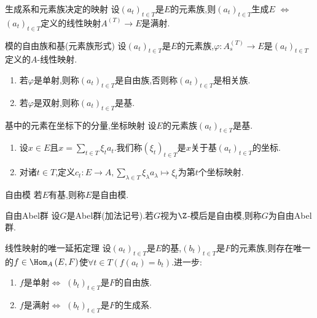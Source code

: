 \begin{corollary}{生成系和元素族决定的映射}{}
	设$\left(a_{t}\right)_{t\in T}$是$E$的元素族,则$\left(a_{t}\right)_{t\in T}$生成$E$ $\iff$ $\left(a_{t}\right)_{t\in T}$定义的线性映射$A^{\left(T\right)}\to E$是满射.
\end{corollary}

\begin{definition}{模的自由族和基(元素族形式)}{}
	设$\left(a_{t}\right)_{t\in T}$是$E$的元素族,$\varphi:A_{s}^{\left(T\right)}\to E$是$\left(a_{t}\right)_{t\in T}$定义的$A$-线性映射.
	\begin{enumerate}
		\item 若$\varphi$是单射,则称$\left(a_{t}\right)_{t\in T}$是自由族,否则称$\left(a_{t}\right)_{t\in T}$是相关族.
		\item 若$\varphi$是双射,则称$\left(a_{t}\right)_{t\in T}$是基.
	\end{enumerate}
\end{definition}

\begin{definition}{基中的元素在坐标下的分量,坐标映射}{}
	设$E$的元素族$\left(a_{t}\right)_{t\in T}$是基.
	\begin{enumerate}
		\item 设$x\in E$且$x=\sum\limits_{t\in T}\xi_{t}a_{t}$.我们称$\left(\xi_{t}\right)_{t\in T}$是$x$关于基$\left(a_{t}\right)_{t\in T}$的坐标.
		\item 对诸$t\in T$,定义$c_{t}:E\to A,\sum\limits_{\lambda\in T}\xi_{\lambda}a_{\lambda}\mapsto \xi_{t}$为第$t$个坐标映射.
	\end{enumerate}
\end{definition}

\begin{definition}{自由模}{}
	若$E$有基,则称$E$是自由模.
\end{definition}

\begin{definition}{自由Abel群}{}
	设$G$是Abel群(加法记号).若$G$视为$\Z$-模后是自由模,则称$G$为自由Abel群.
\end{definition}

\begin{theorem}{线性映射的唯一延拓定理}{}
	设$\left(a_{t}\right)_{t\in T}$是$E$的基,$\left(b_{t}\right)_{t\in T}$是$F$的元素族,则存在唯一的$f\in\Hom_{A}\left(E,F\right)$使$\forall t\in T\left(f\left(a_{t}\right)=b_{t}\right)$.进一步:
	\begin{enumerate}
		\item $f$是单射$\iff$ $\left(b_{t}\right)_{t\in T}$是$F$的自由族.
		\item $f$是满射$\iff$ $\left(b_{t}\right)_{t\in T}$是$F$的生成系.
	\end{enumerate}
\end{theorem}

